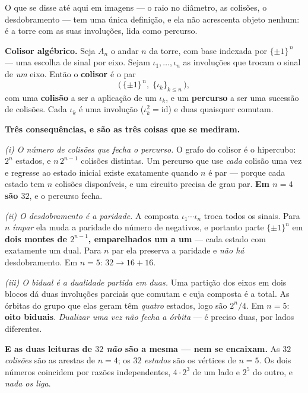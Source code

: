 \documentclass[livro.tex]{subfiles}
\begin{document}
O que se disse até aqui em imagens --- o raio no diâmetro, as colisões, o desdobramento --- tem uma
única definição, e ela não acrescenta objeto nenhum: é a torre com as suas involuções, lida como
percurso.

\begin{mdframed}[linewidth=0.4pt,innerleftmargin=10pt,innerrightmargin=10pt,
                 innertopmargin=8pt,innerbottommargin=8pt,skipabove=6pt,skipbelow=6pt]
\textbf{Colisor algébrico.} Seja $A_n$ o andar $n$ da torre, com base indexada por
$\{\pm1\}^{\,n}$ --- uma escolha de sinal por eixo. Sejam $\iota_1,\dots,\iota_n$ as involuções
que trocam o sinal de \emph{um} eixo. Então o \textbf{colisor} é o par
\[
  \bigl(\,\{\pm1\}^{\,n},\;\{\iota_k\}_{k\le n}\,\bigr),
\]
com uma \textbf{colisão} a ser a aplicação de um $\iota_k$, e um \textbf{percurso} a ser uma
sucessão de colisões. Cada $\iota_k$ é uma involução ($\iota_k^2=\mathrm{id}$) e duas quaisquer
comutam.
\end{mdframed}

\noindent \textbf{Três consequências, e são as três coisas que se mediram.}

\medskip
\noindent \emph{(i) O número de colisões que fecha o percurso.} O grafo do colisor é o hipercubo:
$2^n$ estados, e $n\,2^{n-1}$ colisões distintas. Um percurso que use \emph{cada} colisão uma vez e
regresse ao estado inicial existe exatamente quando $n$ é par --- porque cada estado tem $n$
colisões disponíveis, e um circuito precisa de grau par. \textbf{Em $n=4$ são $32$}, e o percurso
fecha.

\medskip
\noindent \emph{(ii) O desdobramento é a paridade.} A composta $\iota_1\cdots\iota_n$ troca todos
os sinais. Para $n$ \emph{ímpar} ela muda a paridade do número de negativos, e portanto parte
$\{\pm1\}^n$ em \textbf{dois montes de $2^{n-1}$, emparelhados um a um} --- cada estado com
exatamente um dual. Para $n$ par ela preserva a paridade e \emph{não há} desdobramento. Em $n=5$:
$32 \to 16+16$.

\medskip
\noindent \emph{(iii) O bidual é a dualidade partida em duas.} Uma partição dos eixos em dois
blocos dá duas involuções parciais que comutam e cuja composta é a total. As órbitas do grupo que
elas geram têm \emph{quatro} estados, logo são $2^{n}/4$. Em $n=5$: \textbf{oito biduais}.
\emph{Dualizar uma vez não fecha a órbita} --- é preciso duas, por lados diferentes.

\medskip
\noindent \textbf{E as duas leituras de $32$ \emph{não} são a mesma --- nem se encaixam.} As $32$
\emph{colisões} são as arestas de $n=4$; os $32$ \emph{estados} são os vértices de $n=5$. Os dois
números coincidem por razões independentes, $4\cdot2^{3}$ de um lado e $2^{5}$ do outro, e
\emph{nada os liga}.
\end{document}
